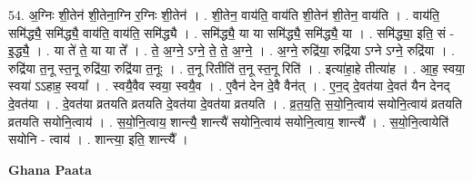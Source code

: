 \documentclass[17pt]{extarticle}
\begin{document}
54. अ॒ग्निः शी॒तेन॑ शी॒तेना॒ग्नि र॒ग्निः शी॒तेन॑ । . शी॒तेन॒ वाय॑ति॒ वाय॑ति शी॒तेन॑ शी॒तेन॒ वाय॑ति । . वाय॑ति॒ समि॑द्ध्यै॒ समि॑द्ध्यै॒ वाय॑ति॒ वाय॑ति॒ समि॑द्ध्यै । . समि॑द्ध्यै॒ या या समि॑द्ध्यै॒ समि॑द्ध्यै॒ या । . समि॑द्ध्या॒ इति॒ सं - इ॒द्ध्यै॒ । . या ते॑ ते॒ या या ते᳚ । . ते॒ अ॒ग्ने॒ ऽग्ने॒ ते॒ ते॒ अ॒ग्ने॒ । . अ॒ग्ने॒ रुद्रि॑या॒ रुद्रि॑या ऽग्ने ऽग्ने॒ रुद्रि॑या । . रुद्रि॑या त॒नू स्त॒नू रुद्रि॑या॒ रुद्रि॑या त॒नूः । . त॒नू रितीति॑ त॒नू स्त॒नू रिति॑ । . इत्या॑हा॒हे तीत्या॑ह । . आ॒ह॒ स्वया॒ स्वया॑ ऽऽहाह॒ स्वया᳚ । . स्वयै॒वैव स्वया॒ स्वयै॒व । . ए॒वैन॑ देन दे॒वै वैन॑त् । . ए॒न॒द् दे॒वत॑या दे॒वत॑ यैन देनद् दे॒वत॑या । . दे॒वत॑या व्रतयति व्रतयति दे॒वत॑या दे॒वत॑या व्रतयति । . व्र॒त॒य॒ति॒ स॒यो॒नि॒त्वाय॑ सयोनि॒त्वाय॑ व्रतयति व्रतयति सयोनि॒त्वाय॑ । . स॒यो॒नि॒त्वाय॒ शान्त्यै॒ शान्त्यै॑ सयोनि॒त्वाय॑ सयोनि॒त्वाय॒ शान्त्यै᳚ । . स॒यो॒नि॒त्वायेति॑ सयोनि - त्वाय॑ । . शान्त्या॒ इति॒ शान्त्यै᳚ । \newline

\textbf{Ghana Paata } \newline
\end{document}
